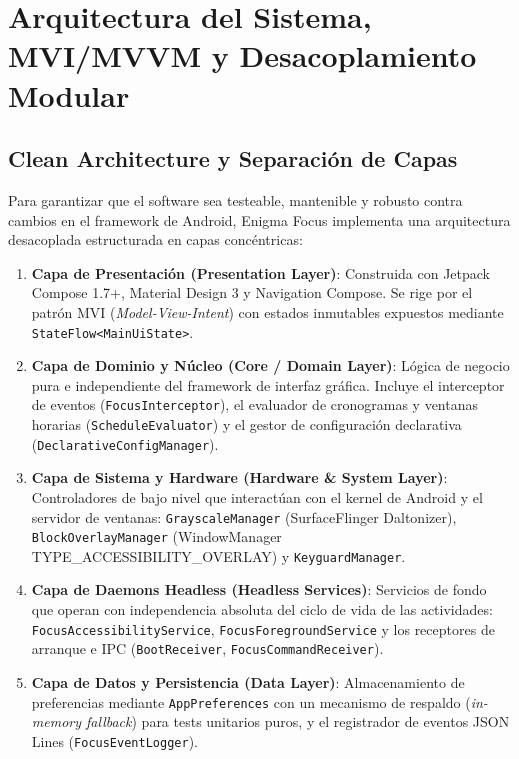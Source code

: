 \documentclass[11pt,a4paper,oneside]{report}
\begin{document}
\newpage

\chapter[Arquitectura y MVI/MVVM]{Arquitectura del Sistema, MVI/MVVM y Desacoplamiento Modular}

\section{Clean Architecture y Separación de Capas}
Para garantizar que el software sea testeable, mantenible y robusto contra cambios en el framework de Android, Enigma Focus implementa una arquitectura desacoplada estructurada en capas concéntricas:

\begin{enumerate}
    \item \textbf{Capa de Presentación (Presentation Layer)}: 
    Construida con Jetpack Compose 1.7+, Material Design 3 y Navigation Compose. Se rige por el patrón MVI (\textit{Model-View-Intent}) con estados inmutables expuestos mediante \texttt{StateFlow<MainUiState>}.
    
    \item \textbf{Capa de Dominio y Núcleo (Core / Domain Layer)}: 
    Lógica de negocio pura e independiente del framework de interfaz gráfica. Incluye el interceptor de eventos (\texttt{FocusInterceptor}), el evaluador de cronogramas y ventanas horarias (\texttt{ScheduleEvaluator}) y el gestor de configuración declarativa (\texttt{DeclarativeConfigManager}).
    
    \item \textbf{Capa de Sistema y Hardware (Hardware \& System Layer)}: 
    Controladores de bajo nivel que interactúan con el kernel de Android y el servidor de ventanas: \texttt{GrayscaleManager} (SurfaceFlinger Daltonizer), \texttt{BlockOverlayManager} (WindowManager TYPE\_ACCESSIBILITY\_OVERLAY) y \texttt{KeyguardManager}.
    
    \item \textbf{Capa de Daemons Headless (Headless Services)}: 
    Servicios de fondo que operan con independencia absoluta del ciclo de vida de las actividades: \texttt{FocusAccessibilityService}, \texttt{FocusForegroundService} y los receptores de arranque e IPC (\texttt{BootReceiver}, \texttt{FocusCommandReceiver}).
    
    \item \textbf{Capa de Datos y Persistencia (Data Layer)}: 
    Almacenamiento de preferencias mediante \texttt{AppPreferences} con un mecanismo de respaldo (\textit{in-memory fallback}) para tests unitarios puros, y el registrador de eventos JSON Lines (\texttt{FocusEventLogger}).
\end{enumerate}
\end{document}
